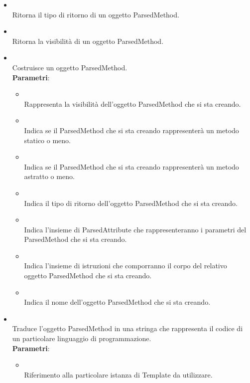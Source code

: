 \begin{itemize}
\begin{itemize}
\item {}
\\ Ritorna il tipo di ritorno di un oggetto ParsedMethod.
\item {}
\\ Ritorna la visibilità di un oggetto ParsedMethod.
\item {}
\\ Costruisce un oggetto ParsedMethod.
\\ \textbf{Parametri}:
\begin{itemize}
\item {}
\\ Rappresenta la visibilità dell'oggetto ParsedMethod che si sta creando.
\item {}
\\ Indica se il ParsedMethod che si sta creando rappresenterà un metodo statico o meno.
\item {}
\\ Indica se il ParsedMethod che si sta creando rappresenterà un metodo astratto o meno.
\item {}
\\ Indica il tipo di ritorno dell'oggetto ParsedMethod che si sta creando.
\item {}
\\ Indica l'insieme di ParsedAttribute che rappresenteranno i parametri del ParsedMethod che si sta creando.
\item {}
\\ Indica l'insieme di istruzioni che comporranno il corpo del relativo oggetto ParsedMethod che si sta creando.
\item {}
\\ Indica il nome dell'oggetto ParsedMethod che si sta creando.
\end{itemize}
\item {}
\\ Traduce l'oggetto ParsedMethod in una stringa che rappresenta il codice di un particolare linguaggio di programmazione.
\\ \textbf{Parametri}:
\begin{itemize}
\item {}
\\ Riferimento alla particolare istanza di Template da utilizzare.
\end{itemize}
\end{itemize}
\end{itemize}

